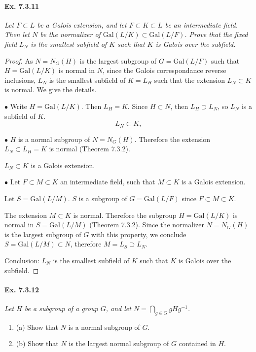 \documentclass[11pt,a4paper]{article}
\newcommand{\be} {\begin{enumerate}}
\newcommand{\ee} {\end{enumerate}}
\newcommand{\Gal}{\mathrm{Gal}}
\begin{document}
\paragraph{Ex. 7.3.11}

{\it Let $F\subset L$ be a Galois extension, and let $F\subset K \subset L$ be an intermediate field. Then let $N$ be the normalizer of $\Gal(L/K) \subset \Gal(L/F)$. Prove that the fixed field $L_N$ is the smallest subfield of $K$ such that $K$ is Galois over the subfield.
}

\begin{proof} As $N = N_G(H)$ is the largest subgroup of $G = \Gal(L/F)$ such that $H = \Gal(L/K)$ is normal in $N$, since the Galois correspondance reverse inclusions, $L_N$ is the smallest subfield of $K = L_H$ such that the extension $L_N \subset K$ is normal. We give the details.

$\bullet$  Write $H = \Gal(L/K)$. Then $L_H = K$. Since $H \subset N$, then $L_H \supset L_N$, so $L_N$ is a subfield of $K$.
$$L_N \subset K,$$

$\bullet$ 
$H$ is a normal subgroup of $N = N_G(H)$. Therefore the extension $L_N \subset L_H = K$ is normal (Theorem 7.3.2).
\begin{center}
$L_N \subset K$ is a Galois extension.
\end{center}

$\bullet$ 
Let  $F \subset M \subset K$ an intermediate field,  such that $M \subset K$ is a Galois extension.

Let $S = \Gal(L/M)$. $S$ is a subgroup of $G=\Gal(L/F)$ since $ F \subset M \subset K$.

The extension $M \subset K$ is normal. Therefore the subgroup $H = \Gal(L/K)$ is normal in $S = \Gal(L/M)$ (Theorem 7.3.2). Since the normalizer $N = N_G(H)$ is the largest subgroup of $G$ with this property, we conclude 
$S = \Gal(L/M) \subset N$, therefore $M = L_S \supset L_N$.

\bigskip

Conclusion: $L_N$ is the smallest subfield of $K$ such that $K$ is Galois over the subfield.
\end{proof}

\paragraph{Ex. 7.3.12}

{\it Let $H$ be a subgroup of a group $G$, and let $N = \bigcap_{g\in G} gHg^{-1}$.
\be
\item[(a)] Show that $N$ is a normal subgroup of $G$.
\item[(b)] Show that $N$ is the largest normal subgroup of $G$ contained in $H$.
\ee
}
\end{document}
